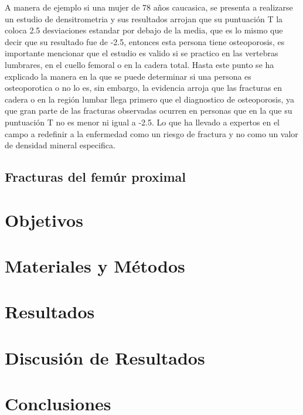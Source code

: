\documentclass[letterpaper,12pt,oneside]{book}
\begin{document}
    \vspace{10pt}


    A manera de ejemplo si una mujer de 78 años caucasica, se presenta a realizarse un estudio de densitrometria y sus resultados arrojan que su puntuación T la coloca 2.5 desviaciones estandar por debajo de la media, que es lo mismo que decir que su resultado fue de -2.5, entonces esta persona tiene osteoporosis, es importante mencionar que el estudio es valido si se practico en las vertebras lumbrares, en el cuello femoral o en la cadera total. Hasta este punto se ha explicado la manera en la que se puede determinar si una persona es osteoporotica o no lo es, sin embargo, la evidencia arroja que las fracturas en cadera o en la región lumbar llega primero que el diagnostico de osteoporosis, ya que gran parte de las fracturas observadas ocurren en personas que en la que su puntuación T no es menor ni igual a -2.5. Lo que ha llevado a expertos en el campo a redefinir a la enfermedad como un riesgo de fractura y no como un valor de densidad mineral especifica.




    
    


    \section{Fracturas del femúr proximal}

    \chapter{Objetivos}
    \chapter{Materiales y Métodos}

    \chapter{Resultados}
    \chapter{Discusión de Resultados}
    \chapter{Conclusiones}
\end{document}
